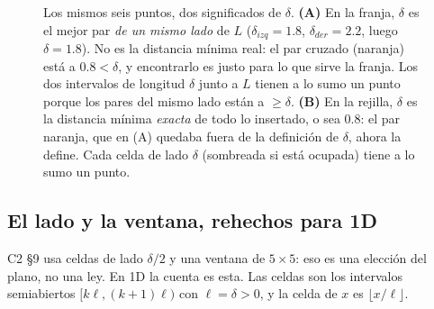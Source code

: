 \documentclass[11pt]{article}
\begin{document}
\begin{figure}[!ht]
\sloppy
\caption{Los mismos seis puntos, dos significados de $\delta$. \textbf{(A)} En la franja, $\delta$ es el mejor
par \emph{de un mismo lado} de $L$ ($\delta_{izq}=1.8$, $\delta_{der}=2.2$, luego $\delta=1.8$). No es la
distancia mínima real: el par cruzado (naranja) está a $0.8<\delta$, y encontrarlo es justo para lo que sirve
la franja. Los dos intervalos de longitud $\delta$ junto a $L$ tienen a lo sumo un punto porque los pares del
mismo lado están a $\ge\delta$. \textbf{(B)} En la rejilla, $\delta$ es la distancia mínima \emph{exacta} de
todo lo insertado, o sea $0.8$: el par naranja, que en (A) quedaba fuera de la definición de $\delta$, ahora la
define. Cada celda de lado $\delta$ (sombreada si está ocupada) tiene a lo sumo un punto.}
\label{fig:delta}
\end{figure}

\subsection{El lado y la ventana, rehechos para 1D}

C2 §9 usa celdas de lado $\delta/2$ y una ventana de $5\times5$: eso es una elección del plano, no una ley.
En 1D la cuenta es esta. Las celdas son los intervalos semiabiertos $[k\ell,(k+1)\ell)$ con
$\ell=\delta>0$, y la celda de $x$ es $\lfloor x/\ell\rfloor$.
\end{document}
